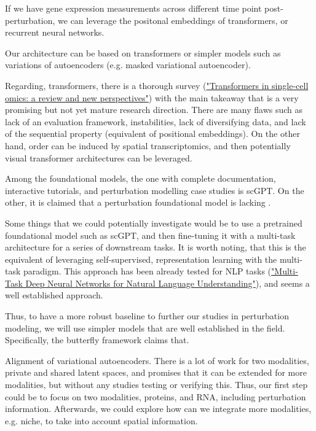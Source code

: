 \documentclass[12pt, a4paper]{article}
\begin{document}
If we have gene expression measurements across different time point post-perturbation, we can leverage the positonal embeddings of transformers, or recurrent neural networks.


Our architecture can be based on transformers or simpler models such as variations of autoencoders (e.g. masked variational autoencoder).

Regarding, transformers, there is a thorough survey (\href{https://www.nature.com/articles/s41592-024-02353-z}{"Transformers in single-cell omics: a review and new perspectives"}) with the main takeaway that is a very promising but not yet mature research direction. There are many flaws such as lack of an evaluation framework, instabilities, lack of diversifying data, and lack of the sequential property (equivalent of positional embeddings). On the other hand, order can be induced by spatial transcriptomics, and then potentially visual transformer architectures can be leveraged.

Among the foundational models, the one with complete documentation, interactive tutorials, and perturbation modelling case studies is scGPT. On the other, it is claimed that a perturbation foundational model is lacking \cite{szalataTransformersSinglecellOmics2024}.

Some things that we could potentially investigate would be to use a pretrained foundational model such as scGPT, and then fine-tuning it with a multi-task architecture for a series of downstream tasks. It is worth noting, that this is the equivalent of leveraging self-supervised, representation learning with the multi-task paradigm. This approach has been already tested for NLP tasks (\href{https://arxiv.org/pdf/1901.11504}{"Multi-Task Deep Neural Networks for Natural Language Understanding"}), and seems a well established approach.

Thus, to have a more robust baseline to further our studies in perturbation modeling, we will use simpler models that are well established in the field. Specifically, the butterfly framework claims that.

Alignment of variational autoencoders. There is a lot of work for two modalities, private and shared latent spaces, and promises that it can be extended for more modalities, but without any studies testing or verifying this. Thus, our first step could be to focus on two modalities, proteins, and RNA, including perturbation information. Afterwards, we could explore how can we integrate more modalities, e.g. niche, to take into account spatial information.
\end{document}
